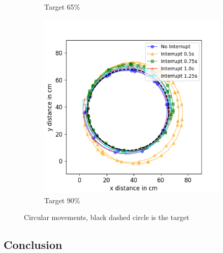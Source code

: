 \begin{figure}[h!]
\begin{subfigure}[b]{0.5\textwidth}
		\caption{Target 65\%}
		\label{fig:circ_exp2}
	\end{subfigure}
	\begin{subfigure}[b]{0.5\textwidth}
		\includegraphics[width=\textwidth]{pics/circle_90.png}
		\caption{Target 90\%}
		\label{fig:circ_exp3}
	\end{subfigure}
	\caption{Circular movements, black dashed circle is the target}
\end{figure}


\subsection{Conclusion}








